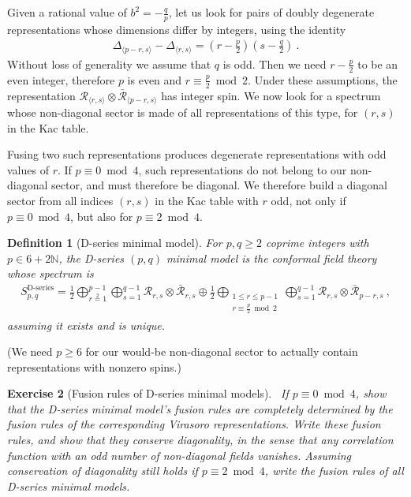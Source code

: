 \documentclass[12pt, a4paper]{article}
\theoremstyle{break}
\newtheorem{exo}{Exercise}[section]
\newtheorem{defn}[exo]{Definition}
\begin{document}
Given a rational value of $b^2=-\frac{q}{p}$, let us look for pairs of doubly degenerate representations whose dimensions differ by integers, using the identity
\begin{align}
 \Delta_{\langle p-r,s\rangle} -\Delta_{\langle r,s\rangle}= \left(r-\frac{p}{2}\right)\left(s-\frac{q}{2}\right)\ .
\end{align}
Without loss of generality we assume that $q$ is odd. Then we need $r-\frac{p}{2}$ to be an even integer, therefore $p$ is even and $r\equiv\frac{p}{2}\bmod 2$. Under these assumptions, the representation $\mathcal{R}_{\langle r,s\rangle}\otimes \bar{\mathcal{R}}_{\langle p-r,s\rangle}$ has integer spin. We now look for a spectrum whose non-diagonal sector is made of all representations of this type, for $(r,s)$ in the Kac table.

Fusing two such representations produces degenerate representations with odd values of $r$. If $p\equiv 0\bmod 4$, such representations do not belong to our non-diagonal sector, and must therefore be diagonal. We therefore build a diagonal sector from all indices $(r,s)$ in the Kac table with $r$ odd, not only if $p\equiv 0\bmod 4$, but also for $p\equiv 2\bmod 4$. 

\begin{defn}[D-series minimal model]
 For $p,q\geq 2$ coprime integers with $p\in 6+2\mathbb{N}$, the D-series $(p,q)$ minimal model is the conformal field theory whose spectrum is 
\begin{align}
 S_{p,q}^\text{D-series} = \frac12 \bigoplus_{r\overset{2}{=}1}^{p-1} \bigoplus_{s=1}^{q-1} \mathcal{R}_{ r,s} \otimes \bar{\mathcal{R}}_{r,s}\oplus \frac12\bigoplus_{\substack{1\leq r\leq p-1 \\ r\equiv \frac{p}{2}\bmod 2}} \bigoplus_{s=1}^{q-1} \mathcal{R}_{r,s} \otimes \bar{\mathcal{R}}_{p-r,s}\ ,
 \label{eq:sds}
\end{align}
assuming it exists and is unique.
\end{defn}
(We need $p\geq 6$ for our would-be non-diagonal sector to actually contain representations with nonzero spins.)

\begin{tcolorbox}
\begin{exo}[Fusion rules of D-series minimal models]
~\label{exo:frd}
 If $p\equiv 0\bmod 4$, show that the D-series minimal model's fusion rules are completely determined by the fusion rules of the corresponding Virasoro representations. Write these fusion rules, and show that they conserve diagonality, in the sense that any correlation function with an odd number of non-diagonal fields vanishes. Assuming conservation of diagonality still holds if $p\equiv 2\bmod 4$, write the fusion rules of all D-series minimal models.
\end{exo}
\end{tcolorbox}
\end{document}
